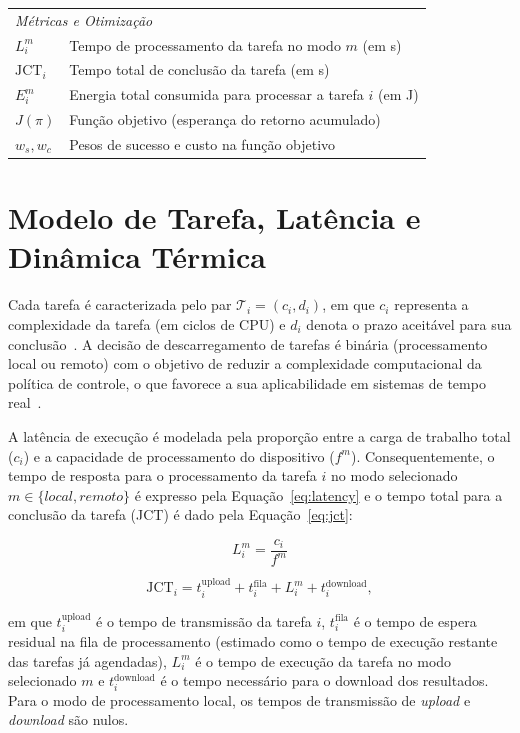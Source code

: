\begin{table}[ht]
{\begin{tabularx}{\columnwidth}{l X}
\multicolumn{2}{l}{\textit{Métricas e Otimização}} \\
$L_i^m$ & Tempo de processamento da tarefa no modo $m$ (em \unit{\second}) \\
$\mathrm{JCT}_i$ & Tempo total de conclusão da tarefa (em \unit{\second}) \\
$E_i^m$ & Energia total consumida para processar a tarefa $i$ (em \unit{\joule}) \\
$J(\pi)$ & Função objetivo (esperança do retorno acumulado) \\
$w_s, w_c$ & Pesos de sucesso e custo na função objetivo \\
\bottomrule
\end{tabularx}}
\end{table}

\section{Modelo de Tarefa, Latência e Dinâmica Térmica}

Cada tarefa é caracterizada pelo par $\mathcal{T}_i=(c_i, d_i)$, em que $c_i$ representa a complexidade da tarefa (em ciclos de \gls{CPU}) e $d_i$ denota o prazo aceitável para sua conclusão~\cite{liu2019, uddin2025, guo2024deep, cao2024survey}. A decisão de descarregamento de tarefas é binária (processamento local ou remoto) com o objetivo de reduzir a complexidade computacional da política de controle, o que favorece a sua aplicabilidade em sistemas de tempo real~\cite{liu2019, fofana2024}.

A latência de execução é modelada pela proporção entre a carga de trabalho total ($c_i$) e a capacidade de processamento do dispositivo ($f^m$). Consequentemente, o tempo de resposta para o processamento da tarefa $i$ no modo selecionado $m \in \{local, remoto\}$ é expresso pela Equação~\ref{eq:latency} e o tempo total para a conclusão da tarefa (\gls{JCT}) é dado pela Equação~\ref{eq:jct}:

\begin{equation}
\label{eq:latency}
L_i^m = \frac{c_i}{f^m}
\end{equation}

\begin{equation}
\mathrm{JCT}_i = t_i^{\mathrm{upload}} + t_i^{\mathrm{fila}} + L_i^m + t_i^{\mathrm{download}},
\label{eq:jct}
\end{equation}

em que $t_i^{\mathrm{upload}}$ é o tempo de transmissão da tarefa $i$, $t_i^{\mathrm{fila}}$ é o tempo de espera residual na fila de processamento (estimado como o tempo de execução restante das tarefas já agendadas), $L_i^m$ é o tempo de execução da tarefa no modo selecionado $m$ e $t_i^{\mathrm{download}}$ é o tempo necessário para o download dos resultados. Para o modo de processamento local, os tempos de transmissão de \textit{upload} e \textit{download} são nulos.

